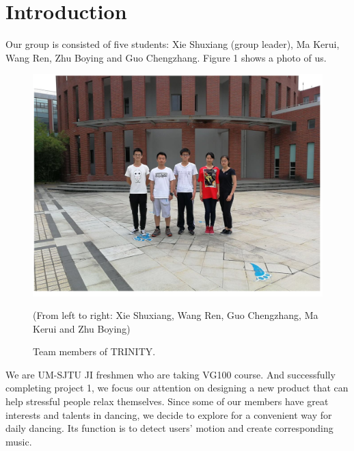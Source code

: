 \section{Introduction}
\par Our group is consisted of five students: Xie Shuxiang (group leader), Ma Kerui, Wang Ren, Zhu Boying and Guo Chengzhang. Figure 1 shows a photo of us.
\begin{figure}
    \centering
    \includegraphics[width=5in]{Pics/group}
    \caption{Team members of TRINITY.}
    (From left to right: Xie Shuxiang, Wang Ren, Guo Chengzhang, Ma Kerui and Zhu Boying)
\end{figure}

\par We are UM-SJTU JI freshmen who are taking VG100 course. And successfully completing project 1, we focus our attention on designing a new product that can help stressful people relax themselves. Since some of our members have great interests and talents in dancing, we decide to explore for a convenient way for daily dancing. Its function is to detect users' motion and create corresponding music.